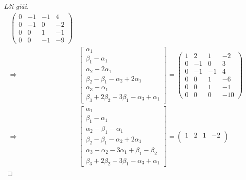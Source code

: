 \documentclass[class=linear-algebra,crop=false]{standalone}
\begin{document}
\begin{proof}[Lời giải]
\begin{align*}
\begin{pmatrix}
            0 & -1 & -1 & 4  \\
            0 & -1 & 0  & -2 \\
            0 & 0  & 1  & -1 \\
            0 & 0  & -1 & -9
        \end{pmatrix}                 \\
        \Longrightarrow &
        \begin{bmatrix}
            \alpha_{1}                                       \\
            \beta_{1} - \alpha_{1}                           \\
            \alpha_{2} - 2\alpha_{1}                         \\
            \beta_{2} - \beta_{1} - \alpha_{2} + 2\alpha_{1} \\
            \alpha_{3} - \alpha_{1}                          \\
            \beta_{3} + 2\beta_{2} - 3\beta_{1} - \alpha_{3} + \alpha_{1}
        \end{bmatrix}=
        \begin{pmatrix}
            1 & 2  & 1  & -2  \\
            0 & -1 & 0  & 3   \\
            0 & -1 & -1 & 4   \\
            0 & 0  & 1  & -6  \\
            0 & 0  & 1  & -1  \\
            0 & 0  & 0  & -10
        \end{pmatrix}                \\
        \Longrightarrow &
        \begin{bmatrix}
            \alpha_{1}                                                    \\
            \beta_{1} - \alpha_{1}                                        \\
            \alpha_{2} - \beta_{1} - \alpha_{1}                           \\
            \beta_{2} - \beta_{1} - \alpha_{2} + 2\alpha_{1}              \\
            \alpha_{3} + \alpha_{2} - 3\alpha_{1} + \beta_{1} - \beta_{2} \\
            \beta_{3} + 2\beta_{2} - 3\beta_{1} - \alpha_{3} + \alpha_{1}
        \end{bmatrix}=
        \begin{pmatrix}
            1 & 2  & 1  & -2  \\

\end{pmatrix}
\end{align*}
\end{proof}
\end{document}
